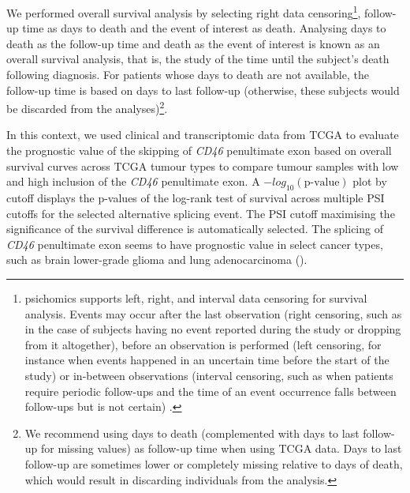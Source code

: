 We performed overall survival analysis by selecting right data censoring\footnote{psichomics supports left, right, and interval data censoring for survival analysis. Events may occur after the last observation (right censoring, such as in the case of subjects having no event reported during the study or dropping from it altogether), before an observation is performed (left censoring, for instance when events happened in an uncertain time before the start of the study) or in-between observations (interval censoring, such as when patients require periodic follow-ups and the time of an event occurrence falls between follow-ups but is not certain) \cite{zhang:2010wk}.}, follow-up time as days to death and the event of interest as death. Analysing days to death as the follow-up time and death as the event of interest is known as an overall survival analysis, that is, the study of the time until the subject’s death following diagnosis. For patients whose days to death are not available, the follow-up time is based on days to last follow-up (otherwise, these subjects would be discarded from the analyses)\footnote{We recommend using days to death (complemented with days to last follow-up for missing values) as follow-up time when using TCGA data. Days to last follow-up are sometimes lower or completely missing relative to days of death, which would result in discarding individuals from the analysis.}.
 
In this context, we used clinical and transcriptomic data from TCGA to evaluate the prognostic value of the skipping of \emph{CD46} penultimate exon based on overall survival curves across TCGA tumour types to compare tumour samples with low and high inclusion of the \emph{CD46} penultimate exon. A $-log_{10}(\textrm{p-value})$ plot by cutoff displays the p-values of the log-rank test of survival across multiple PSI cutoffs for the selected alternative splicing event. The PSI cutoff maximising the significance of the survival difference is automatically selected. The splicing of \emph{CD46} penultimate exon seems to have prognostic value in select cancer types, such as brain lower-grade glioma and lung adenocarcinoma ().


